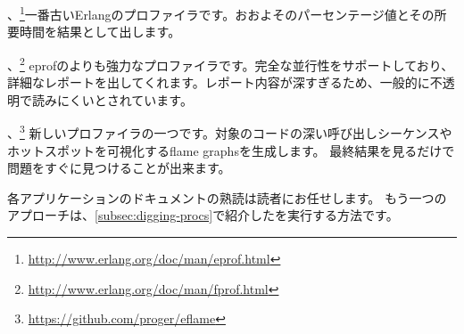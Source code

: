 \begin{itemize*}
 \item {}、\footnote{\href{http://www.erlang.org/doc/man/eprof.html}{http://www.erlang.org/doc/man/eprof.html}}一番古いErlangのプロファイラです。おおよそのパーセンテージ値とその所要時間を結果として出します。
	\item {}、\footnote{\href{http://www.erlang.org/doc/man/fprof.html}{http://www.erlang.org/doc/man/fprof.html}}
eprofのよりも強力なプロファイラです。完全な並行性をサポートしており、詳細なレポートを出してくれます。レポート内容が深すぎるため、一般的に不透明で読みにくいとされています。

  \item {}、\footnote{\href{https://github.com/proger/eflame}{https://github.com/proger/eflame}}
新しいプロファイラの一つです。対象のコードの深い呼び出しシーケンスやホットスポットを可視化するflame graphsを生成します。
最終結果を見るだけで問題をすぐに見つけることが出来ます。

\end{itemize*}

各アプリケーションのドキュメントの熟読は読者にお任せします。
もう一つのアプローチは、\ref{subsec:digging-procs}で紹介したを実行する方法です。

